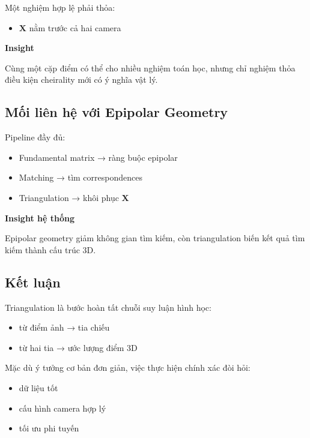 Một nghiệm hợp lệ phải thỏa:

\begin{itemize}
	\item $\mathbf{X}$ nằm trước cả hai camera
\end{itemize}

\begin{mdframed}[style=infobox]
	\textbf{Insight}
	
	Cùng một cặp điểm có thể cho nhiều nghiệm toán học, nhưng chỉ nghiệm thỏa điều kiện cheirality mới có ý nghĩa vật lý.
\end{mdframed}

\subsection{Mối liên hệ với Epipolar Geometry}
\label{subsec:triangulation_epipolar}

Pipeline đầy đủ:

\begin{itemize}
	\item Fundamental matrix → ràng buộc epipolar
	\item Matching → tìm correspondences
	\item Triangulation → khôi phục $\mathbf{X}$
\end{itemize}

\begin{mdframed}[style=infobox]
	\textbf{Insight hệ thống}
	
	Epipolar geometry giảm không gian tìm kiếm, còn triangulation biến kết quả tìm kiếm thành cấu trúc 3D.
\end{mdframed}

\subsection*{Kết luận}
\label{subsec:triangulation_conclusion}

Triangulation là bước hoàn tất chuỗi suy luận hình học:

\begin{itemize}
	\item từ điểm ảnh → tia chiếu
	\item từ hai tia → ước lượng điểm 3D
\end{itemize}

Mặc dù ý tưởng cơ bản đơn giản, việc thực hiện chính xác đòi hỏi:

\begin{itemize}
	\item dữ liệu tốt
	\item cấu hình camera hợp lý
	\item tối ưu phi tuyến
\end{itemize}

